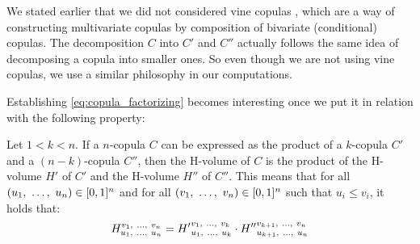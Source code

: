 \begin{remark}
    We stated earlier that we did not considered vine copulas \cite{czado_vine_2022}, which are a way of constructing multivariate copulas by composition of bivariate (conditional) copulas. The decomposition $C$ into $C'$ and $C''$ actually follows the same idea of decomposing a copula into smaller ones. So even though we are not using vine copulas, we use a similar philosophy in our computations.
\end{remark}

Establishing \cref{eq:copula_factorizing} becomes interesting once we put it in relation with the following property:
\begin{proposition}\label{prop:hvol_factorizing}
    Let $1<k<n$. If a $n$-copula $C$ can be expressed as the product of a $k$-copula $C'$ and a $(n-k)$-copula $C''$, then the H-volume of $C$ is the product of the H-volume $H'$ of $C'$ and the H-volume $H''$ of $C''$. This means that for all $(u_1 , ~\dots, ~ u_n)\in[0,1]^n$ and for all $(v_1 , ~\dots, ~ v_n)\in[0,1]^n$ such that $u_i\leqslant v_i$, it holds that:
    \begin{align}
        H_{u_1 , ~\dots, ~ u_n}^{v_1 , ~\dots, ~ v_n} = {H'}_{u_1 , ~\dots, ~ u_k}^{v_1 , ~\dots, ~ v_k}\cdot{H''}_{u_{k+1} , ~\dots, ~ u_n}^{v_{k+1} , ~\dots, ~ v_n}
    \end{align}
\end{proposition}

